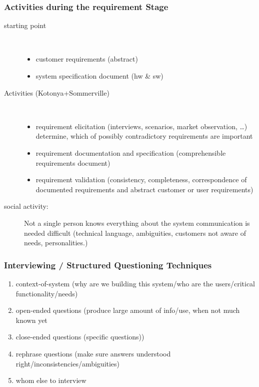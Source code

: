\documentclass[a4paper, 10pt]{article}
\begin{document}
\subsubsection{Activities during the requirement Stage}
	\begin{description}
		\item[starting point] \ \\
			\begin{itemize}
				\item customer requirements (abstract)
				\item system specification document (hw \& sw)
			\end{itemize}
		\item[Activities (Kotonya+Sommerville)] \ \\
			\begin{itemize}
				\item requirement elicitation (interviews, scenarios, market observation, \dots) \\
				determine, which of possibly contradictory requirements are important
				\item requirement documentation and specification (comprehensible requirements document)
				\item requirement validation (consistency, completeness, correspondence of documented requirements and abstract customer or user requirements)
			\end{itemize}
			
			\item[social activity:]
			Not a single person knows everything about the system \follows communication is needed \follows difficult (technical language, ambiguities, customers not aware of needs, personalities.)
	\end{description}

\subsubsection{Interviewing / Structured Questioning Techniques}
\begin{enumerate}
	\item context-of-system (why are we building this system/who are the users/critical functionality/needs)
	\item open-ended questions (produce large amount of info/use, when not much known yet
	\item close-ended questions (specific questions))
	\item rephrase questions (make sure answers understood right/inconsistencies/ambiguities)
	\item whom else to interview
\end{enumerate}
\end{document}
